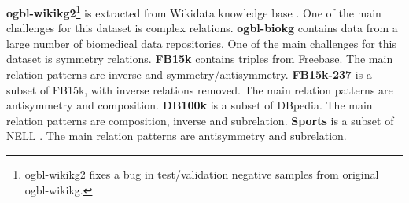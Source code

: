 \documentclass[11pt,a4paper]{article}
\begin{document}
\textbf{ogbl-wikikg2}\footnote{ogbl-wikikg2 fixes a bug in test/validation negative samples from original ogbl-wikikg.} \cite{hu2020open} is extracted from Wikidata knowledge base \cite {vrandevcic2014wikidata}. One of the main challenges for this dataset is complex relations. \textbf{ogbl-biokg} \cite{hu2020open} contains data from a large number of biomedical data repositories. One of the main challenges for this dataset is symmetry relations. \textbf{FB15k} \cite{bordes2013translating} contains triples from Freebase.
The main relation patterns are inverse and symmetry/antisymmetry.
\textbf{FB15k-237} \cite{toutanova2015observed} is a subset of FB15k, with inverse relations removed.
The main relation patterns are antisymmetry and composition.
\textbf{DB100k} \cite{ding2018improving} is a subset of DBpedia.
The main relation patterns are composition, inverse and subrelation.
\textbf{Sports} \cite{wang2015knowledge} is a subset of NELL \cite{mitchell2018never}.
The main relation patterns are antisymmetry and subrelation.


\begin{table}[t]
\centering
{}
\label{table:datasets}
\caption{\label{table:dataset} Number of entities, relations, and observed triples in each split for the six benchmarks.}
\end{table}
\end{document}
